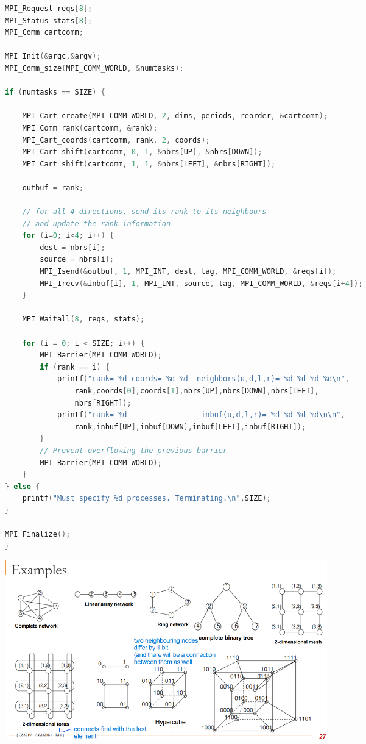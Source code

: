 \documentclass[10pt, landscape]{article}
\begin{document}
\begin{multicols}{4}
\begin{lstlisting}[language=C++, breaklines=true, breakatwhitespace=true]
MPI_Request reqs[8];
MPI_Status stats[8];
MPI_Comm cartcomm;

MPI_Init(&argc,&argv);
MPI_Comm_size(MPI_COMM_WORLD, &numtasks);

if (numtasks == SIZE) {
    
    MPI_Cart_create(MPI_COMM_WORLD, 2, dims, periods, reorder, &cartcomm);
    MPI_Comm_rank(cartcomm, &rank);
    MPI_Cart_coords(cartcomm, rank, 2, coords);
    MPI_Cart_shift(cartcomm, 0, 1, &nbrs[UP], &nbrs[DOWN]);
    MPI_Cart_shift(cartcomm, 1, 1, &nbrs[LEFT], &nbrs[RIGHT]);

    outbuf = rank;

    // for all 4 directions, send its rank to its neighbours
    // and update the rank information
    for (i=0; i<4; i++)	{
        dest = nbrs[i];
        source = nbrs[i];
        MPI_Isend(&outbuf, 1, MPI_INT, dest, tag, MPI_COMM_WORLD, &reqs[i]);
        MPI_Irecv(&inbuf[i], 1, MPI_INT, source, tag, MPI_COMM_WORLD, &reqs[i+4]);
    }

    MPI_Waitall(8, reqs, stats);
    
    for (i = 0; i < SIZE; i++) {
        MPI_Barrier(MPI_COMM_WORLD);
        if (rank == i) {
            printf("rank= %d coords= %d %d  neighbors(u,d,l,r)= %d %d %d %d\n",
                rank,coords[0],coords[1],nbrs[UP],nbrs[DOWN],nbrs[LEFT], 
                nbrs[RIGHT]);
            printf("rank= %d                 inbuf(u,d,l,r)= %d %d %d %d\n\n",
                rank,inbuf[UP],inbuf[DOWN],inbuf[LEFT],inbuf[RIGHT]);
        }
        // Prevent overflowing the previous barrier
        MPI_Barrier(MPI_COMM_WORLD);
    }
} else {
    printf("Must specify %d processes. Terminating.\n",SIZE);
}

MPI_Finalize();
}
    \end{lstlisting}
    

    \end{multicols}
    


\pagebreak

\centering
\includegraphics*[width=14cm]{many_interconnects.png}
\end{document}
